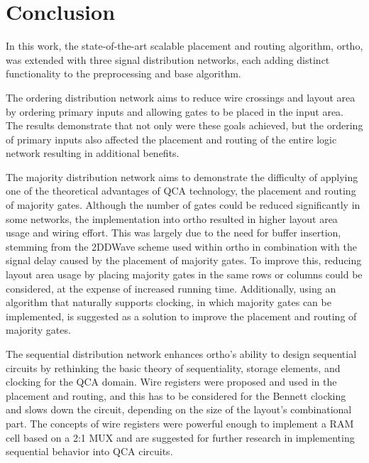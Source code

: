 \chapter{Conclusion}

In this work, the state-of-the-art scalable placement and routing algorithm, ortho, was extended with three signal distribution networks, each adding distinct functionality to the preprocessing and base algorithm.

The ordering distribution network aims to reduce wire crossings and layout area by ordering primary inputs and allowing gates to be placed in the input area. The results demonstrate that not only were these goals achieved, but the ordering of primary inputs also affected the placement and routing of the entire logic network resulting in additional benefits.

The majority distribution network aims to demonstrate the difficulty of applying one of the theoretical advantages of QCA technology, the placement and routing of majority gates. Although the number of gates could be reduced significantly in some networks, the implementation into ortho resulted in higher layout area usage and wiring effort. This was largely due to the need for buffer insertion, stemming from the 2DDWave scheme used within ortho in combination with the signal delay caused by the placement of majority gates. To improve this, reducing layout area usage by placing majority gates in the same rows or columns could be considered, at the expense of increased running time. Additionally, using an algorithm that naturally supports clocking, in which majority gates can be implemented, is suggested as a solution to improve the placement and routing of majority gates.

The sequential distribution network enhances ortho's ability to design sequential circuits by rethinking the basic theory of sequentiality, storage elements, and clocking for the QCA domain. Wire registers were proposed and used in the placement and routing, and this has to be considered for the Bennett clocking and slows down the circuit, depending on the size of the layout's combinational part. The concepts of wire registers were powerful enough to implement a RAM cell based on a 2:1 MUX and are suggested for further research in implementing sequential behavior into QCA circuits.